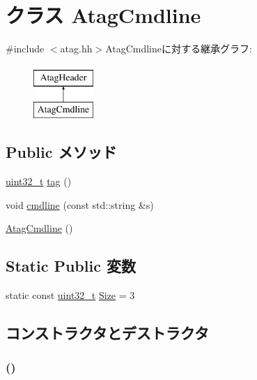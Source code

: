 \hypertarget{classAtagCmdline}{
\section{クラス AtagCmdline}
\label{classAtagCmdline}
}


{\ttfamily \#include $<$atag.hh$>$}AtagCmdlineに対する継承グラフ:\begin{figure}[H]
\begin{center}
\leavevmode
\includegraphics[height=2cm]{classAtagCmdline}
\end{center}
\end{figure}
\subsection*{Public メソッド}
\begin{DoxyCompactItemize}
\item 
\hyperlink{Type_8hh_a435d1572bf3f880d55459d9805097f62}{uint32\_\-t} \hyperlink{classAtagCmdline_afe29fbb80b1d2765e37e98c6d259ea52}{tag} ()
\item 
void \hyperlink{classAtagCmdline_ae151a0716df5ef8d2f9f327b5a10106d}{cmdline} (const std::string \&s)
\item 
\hyperlink{classAtagCmdline_af454650ca50ff5107c18842acdda486b}{AtagCmdline} ()
\end{DoxyCompactItemize}
\subsection*{Static Public 変数}
\begin{DoxyCompactItemize}
\item 
static const \hyperlink{Type_8hh_a435d1572bf3f880d55459d9805097f62}{uint32\_\-t} \hyperlink{classAtagCmdline_a7ecea14dd0f3277e19580d4509fafdba}{Size} = 3
\end{DoxyCompactItemize}


\subsection{コンストラクタとデストラクタ}
\hypertarget{classAtagCmdline_af454650ca50ff5107c18842acdda486b}{
\subsubsection[{AtagCmdline}]{ ()}}
\label{classAtagCmdline_af454650ca50ff5107c18842acdda486b}




